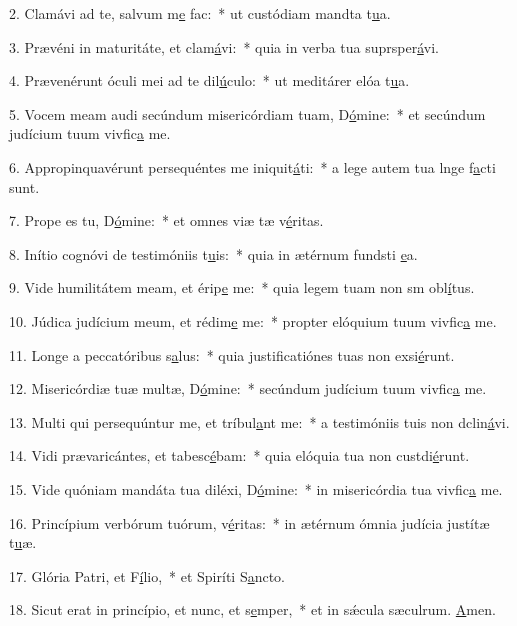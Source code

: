 2. Clamávi ad te, salvum m\uline{e} fac:~* ut custódiam mandta t\uline{u}a.\par 
3. Prævéni in maturitáte, et clam\uline{á}vi:~* quia in verba tua suprsper\uline{á}vi.\par 
4. Prævenérunt óculi mei ad te dil\uline{ú}culo:~* ut meditárer elóa t\uline{u}a.\par 
5. Vocem meam audi secúndum misericórdiam tuam, D\uline{ó}mine:~* et secúndum judícium tuum vivfic\uline{a} me.\par 
6. Appropinquavérunt persequéntes me iniquit\uline{á}ti:~* a lege autem tua lnge f\uline{a}cti sunt.\par 
7. Prope es tu, D\uline{ó}mine:~* et omnes viæ tæ v\uline{é}ritas.\par 
8. Inítio cognóvi de testimóniis t\uline{u}is:~* quia in ætérnum fundsti \uline{e}a.\par 
9. Vide humilitátem meam, et érip\uline{e} me:~* quia legem tuam non sm obl\uline{í}tus.\par 
10. Júdica judícium meum, et rédim\uline{e} me:~* propter elóquium tuum vivfic\uline{a} me.\par 
11. Longe a peccatóribus s\uline{a}lus:~* quia justificatiónes tuas non exsi\uline{é}runt.\par 
12. Misericórdiæ tuæ multæ, D\uline{ó}mine:~* secúndum judícium tuum vivfic\uline{a} me.\par 
13. Multi qui persequúntur me, et tríbul\uline{a}nt me:~* a testimóniis tuis non dclin\uline{á}vi.\par 
14. Vidi prævaricántes, et tabesc\uline{é}bam:~* quia elóquia tua non custdi\uline{é}runt.\par 
15. Vide quóniam mandáta tua diléxi, D\uline{ó}mine:~* in misericórdia tua vivfic\uline{a} me.\par 
16. Princípium verbórum tuórum, v\uline{é}ritas:~* in ætérnum ómnia judícia justítæ t\uline{u}æ.\par 
17. Glória Patri, et F\uline{í}lio,~* et Spiríti S\uline{a}ncto.\par 
18. Sicut erat in princípio, et nunc, et s\uline{e}mper,~* et in sǽcula sæculrum. \uline{A}men.\par 
